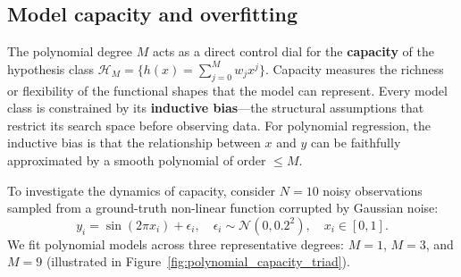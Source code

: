 \subsection{Model capacity and overfitting}
\label{sec:capacity_underfitting_overfitting}

The polynomial degree $M$ acts as a direct control dial for the \textbf{capacity} of the hypothesis class $\mathcal{H}_M = \{h(x) = \sum_{j=0}^M w_j x^j\}$. Capacity measures the richness or flexibility of the functional shapes that the model can represent. Every model class is constrained by its \textbf{inductive bias}---the structural assumptions that restrict its search space before observing data. For polynomial regression, the inductive bias is that the relationship between $x$ and $y$ can be faithfully approximated by a smooth polynomial of order $\le M$.

To investigate the dynamics of capacity, consider $N = 10$ noisy observations sampled from a ground-truth non-linear function corrupted by Gaussian noise:
\begin{equation}
y_i = \sin(2\pi x_i) + \epsilon_i, \quad \epsilon_i \sim \mathcal{N}(0, 0.2^2), \quad x_i \in [0, 1].
\label{eq:sinusoid_synthetic}
\end{equation}
We fit polynomial models across three representative degrees: $M = 1$, $M = 3$, and $M = 9$ (illustrated in Figure~\ref{fig:polynomial_capacity_triad}).

